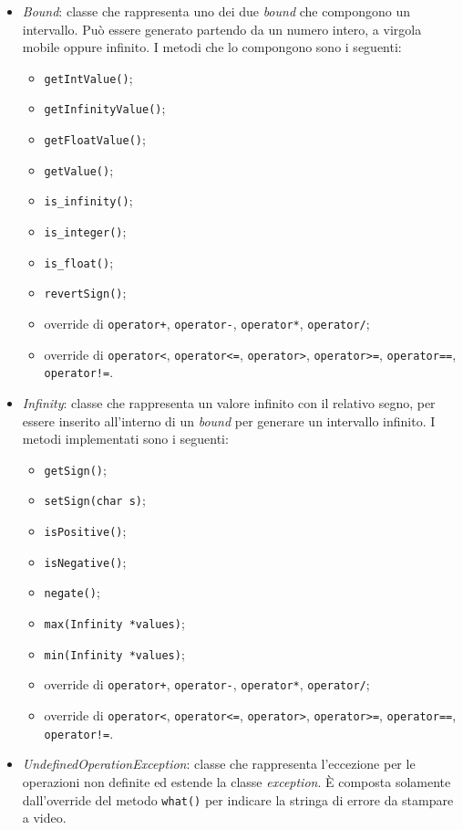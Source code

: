\documentclass[a4paper, 10pt]{report}
\begin{document}
\begin{itemize}
	\item \textit{Bound}: classe che rappresenta uno dei due \textit{bound} che compongono un intervallo. Può essere generato partendo da un numero intero, a virgola mobile oppure infinito. I metodi che lo compongono sono i seguenti:
	\begin{itemize}
		\item \verb|getIntValue()|;
		\item \verb|getInfinityValue()|;
		\item \verb|getFloatValue()|;
		\item \verb|getValue()|;
		\item \verb|is_infinity()|;
		\item \verb|is_integer()|;
		\item \verb|is_float()|;
		\item \verb|revertSign()|;
		\item override di \verb|operator+|, \verb|operator-|, \verb|operator*|, \verb|operator/|;
		\item override di \verb|operator<|, \verb|operator<=|, \verb|operator>|, \verb|operator>=|, \verb|operator==|, \verb|operator!=|.
	\end{itemize}
	\item \textit{Infinity}: classe che rappresenta un valore infinito con il relativo segno, per essere inserito all'interno di un \textit{bound} per generare un intervallo infinito. I metodi implementati sono i seguenti:
	\begin{itemize}
		\item \verb|getSign()|;
		\item \verb|setSign(char s)|;
		\item \verb|isPositive()|;
		\item \verb|isNegative()|;
		\item \verb|negate()|;
		\item \verb|max(Infinity *values)|;
		\item \verb|min(Infinity *values)|;
		\item override di \verb|operator+|, \verb|operator-|, \verb|operator*|, \verb|operator/|;
		\item override di \verb|operator<|, \verb|operator<=|, \verb|operator>|, \verb|operator>=|, \verb|operator==|, \verb|operator!=|.
	\end{itemize}
	\item \textit{UndefinedOperationException}: classe che rappresenta l'eccezione per le operazioni non definite ed estende la classe \textit{exception}. È composta solamente dall'override del metodo \verb|what()| per indicare la stringa di errore da stampare a video.
	
\end{itemize}
\end{document}
